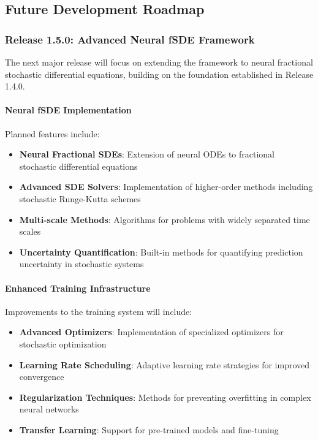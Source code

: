 \subsection{Future Development Roadmap}

\subsubsection{Release 1.5.0: Advanced Neural fSDE Framework}

The next major release will focus on extending the framework to neural fractional stochastic differential equations, building on the foundation established in Release 1.4.0.

\paragraph{Neural fSDE Implementation}
Planned features include:

\begin{itemize}
    \item \textbf{Neural Fractional SDEs}: Extension of neural ODEs to fractional stochastic differential equations
    \item \textbf{Advanced SDE Solvers}: Implementation of higher-order methods including stochastic Runge-Kutta schemes
    \item \textbf{Multi-scale Methods}: Algorithms for problems with widely separated time scales
    \item \textbf{Uncertainty Quantification}: Built-in methods for quantifying prediction uncertainty in stochastic systems
\end{itemize}

\paragraph{Enhanced Training Infrastructure}
Improvements to the training system will include:

\begin{itemize}
    \item \textbf{Advanced Optimizers}: Implementation of specialized optimizers for stochastic optimization
    \item \textbf{Learning Rate Scheduling}: Adaptive learning rate strategies for improved convergence
    \item \textbf{Regularization Techniques}: Methods for preventing overfitting in complex neural networks
    \item \textbf{Transfer Learning}: Support for pre-trained models and fine-tuning
\end{itemize}

